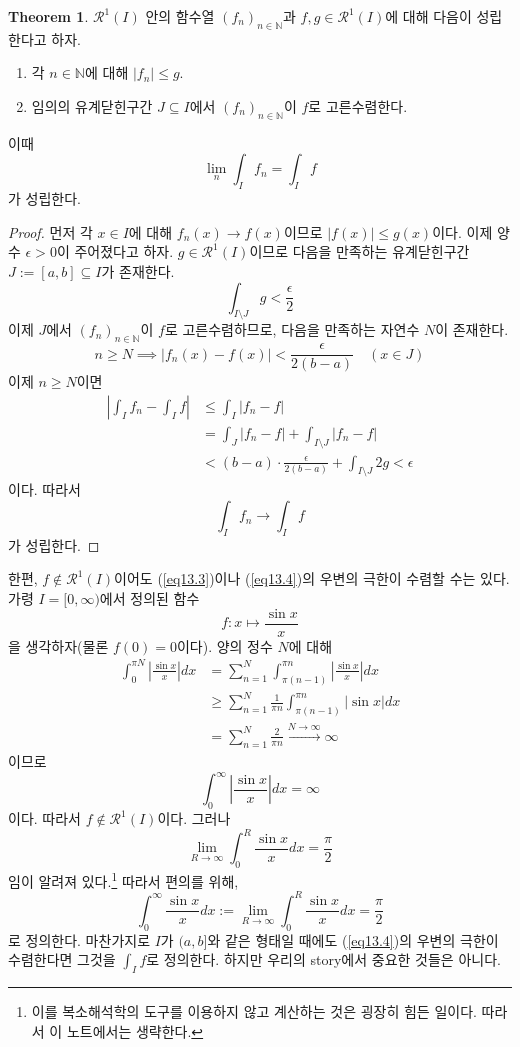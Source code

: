 \documentclass[11pt]{book}
\numberwithin{equation}{chapter}
\def\NN{\mathbb{N}}
\def\eps{\epsilon}
\def\calR{\mathcal{R}}
\newcommand{\abs}[1]{\left\vert#1\right\vert}
\theoremstyle{definition}
\newtheorem{thm}{Theorem}[section]
\newenvironment{enum}
	{\begin{enumerate}[label=(\alph*), leftmargin=2\parindent]}
	{\end{enumerate}}
\begin{document}
\begin{thm} \label{13.1.14}
    \(\calR^1(I)\) 안의 함수열 \((f_n)_{n \in \NN}\)과 \(f, g \in \calR^1(I)\)에 대해 다음이 성립한다고 하자.
    \begin{enum}
        \item 각 \(n \in \NN\)에 대해 \(\abs{f_n} \le g\).
        \item 임의의 유계닫힌구간 \(J \subseteq I\)에서 \((f_n)_{n \in \NN}\)이 \(f\)로 고른수렴한다.
    \end{enum}
    이때
    \[
    \lim_{n} \int_I f_n = \int_I f    
    \]
    가 성립한다.
\end{thm}
\begin{proof}
    먼저 각 \(x \in I\)에 대해 \(f_n(x) \to f(x)\)이므로 \(\abs{f(x)} \le g(x)\)이다. 이제 양수 \(\eps > 0\)이 주어졌다고 하자. \(g \in \calR^1(I)\)이므로 다음을 만족하는 유계닫힌구간 \(J := [a, b] \subseteq I\)가 존재한다.
    \[
    \int_{I \setminus J} g < \frac{\eps}{2}    
    \]
    이제 \(J\)에서 \((f_n)_{n \in \NN}\)이 \(f\)로 고른수렴하므로, 다음을 만족하는 자연수 \(N\)이 존재한다.
    \[
    n \ge N \implies \abs{f_n(x) - f(x)} < \frac{\eps}{2(b-a)} \quad (x \in J)    
    \]
    이제 \(n \ge N\)이면
    \begin{align*}
        \abs{\int_I f_n - \int_I f} &\le \int_I \abs{f_n - f}\\
        &= \int_J \abs{f_n - f} + \int_{I \setminus J} \abs{f_n - f}\\
        &< (b-a) \cdot \frac{\eps}{2(b-a)} + \int_{I \setminus J} 2g < \eps
    \end{align*}
    이다. 따라서
    \[
    \int_I f_n \to \int_I f    
    \]
    가 성립한다.
\end{proof}

한편, \(f \notin \calR^1(I)\)이어도 (\ref{eq13.3})이나 (\ref{eq13.4})의 우변의 극한이 수렴할 수는 있다. 가령 \(I = [0, \infty)\)에서 정의된 함수
\[
f : x \mapsto \frac{\sin x}{x}
\]
을 생각하자(물론 \(f(0) = 0\)이다). 양의 정수 \(N\)에 대해
\begin{align*}
    \int_0^{\pi N} \abs{\frac{\sin x}{x}} dx &= \sum_{n=1}^N \int_{\pi(n-1)}^{\pi n} \abs{\frac{\sin x}{x}} dx\\
    &\ge \sum_{n=1}^N \frac{1}{\pi n} \int_{\pi(n-1)}^{\pi n} \abs{\sin x} dx\\
    &= \sum_{n=1}^N \frac{2}{\pi n} \xrightarrow[]{N \to \infty} \infty
\end{align*}
이므로
\[
\int_0^\infty \abs{\frac{\sin x}{x}} dx = \infty
\]
이다. 따라서 \(f \notin \calR^1(I)\)이다. 그러나
\[
\lim_{R \to \infty} \int_0^{R} \frac{\sin x}{x} dx = \frac{\pi}{2}
\]
임이 알려져 있다.\footnote{이를 복소해석학의 도구를 이용하지 않고 계산하는 것은 굉장히 힘든 일이다. 따라서 이 노트에서는 생략한다.} 따라서 편의를 위해,
\[
\int_0^\infty \frac{\sin x}{x} dx := \lim_{R \to \infty} \int_0^{R} \frac{\sin x}{x} dx = \frac{\pi}{2}    
\]
로 정의한다. 마찬가지로 \(I\)가 \((a, b]\)와 같은 형태일 때에도 (\ref{eq13.4})의 우변의 극한이 수렴한다면 그것을 \(\int_I f\)로 정의한다. 하지만 우리의 story에서 중요한 것들은 아니다.
\end{document}
